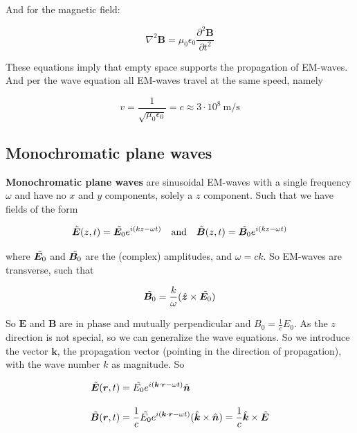 \documentclass[a4paper]{article}
\begin{document}
And for the magnetic field:

\begin{equation}
    \nabla^2\bm{B}=\mu_0\epsilon_0\frac{\partial^2\bm{B}}{\partial t^2}
\end{equation}

These equations imply that empty space supports the propagation of EM-waves. And per the wave equation all EM-waves travel at the same speed, namely

\begin{equation}
    v=\frac{1}{\sqrt{\mu_0\epsilon_0}}=c\approx 3\cdot 10^8\ \si{\meter\per\second}
\end{equation}

\subsection{Monochromatic plane waves}

\textbf{Monochromatic plane waves} are sinusoidal EM-waves with a single frequency $\omega$ and have no $x$ and $y$ components, solely a $z$ component. Such that we have fields of the form

\begin{equation*}
    \Tilde{\bm{E}}(z, t) = \Tilde{\bm{E}_0}e^{i(kz-\omega t)}\quad\text{and}\quad\Tilde{\bm{B}}(z, t) = \Tilde{\bm{B}_0}e^{i(kz-\omega t)}
\end{equation*}

where $\Tilde{\bm{E}_0}$ and $\Tilde{\bm{B}_0}$ are the (complex) amplitudes, and $\omega=ck$. So EM-waves are transverse, such that

\begin{equation*}
    \Tilde{\bm{B}_0}=\frac{k}{\omega}(\hat{\bm{z}}\times\Tilde{\bm{E}_0})
\end{equation*}

So $\bm{E}$ and $\bm{B}$ are in phase and mutually perpendicular and $B_0=\frac{1}{c}E_0$. As the $z$ direction is not special, so we can generalize the wave equations. So we introduce the vector $\bm{k}$, the propagation vector (pointing in the direction of propagation), with the wave number $k$ as magnitude. So

\begin{align*}
    \Tilde{\bm{E}}(\bm{r}, t) &= \Tilde{E_0}e^{i(\bm{k}\cdot\bm{r}-\omega t)}\hat{\bm{n}}\\[1em]
    \Tilde{\bm{B}}(\bm{r}, t) &= \frac{1}{c}\Tilde{E_0}e^{i(\bm{k}\cdot\bm{r}-\omega t)}(\hat{\bm{k}}\times\hat{\bm{n}})=\frac{1}{c}\hat{\bm{k}}\times\Tilde{\bm{E}}
\end{align*}
\end{document}

